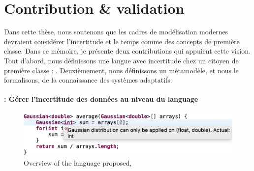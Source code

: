\section{Contribution \& validation}

%
Dans cette thèse, nous soutenons que les cadres de modélisation modernes devraient considérer l'incertitude et le temps comme des concepts de première classe.
Dans ce mémoire, je présente deux contributions qui appuient cette vision.
Tout d'abord, nous définissons une langue avec incertitude chez un citoyen de première classe : \langName. 
Deuxièmement, nous définissons un métamodèle, et nous le formalisons, de la connaissance des systèmes adaptatifs. 

\paragraph{\langName{}: Gérer l'incertitude des données au niveau du language}
\begin{figure}
	\centering
	\includegraphics[width=\linewidth]{img/chapt-intro/approach/aintea-overview}
	\caption{Overview of the language proposed, \langName{}}
	\label{fig_french_contrib_aintea}
\end{figure}

